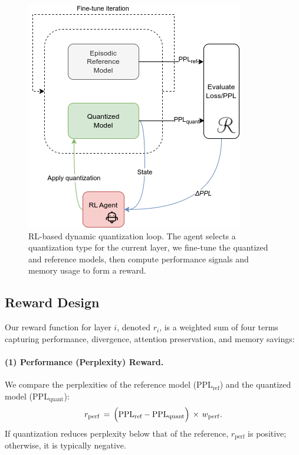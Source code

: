 \documentclass{article}
\begin{document}
	\begin{figure}[t]
		\centering
		\includegraphics[width=0.95\linewidth]{images/dynaq-scheme.png}
		\vspace{-0.5em}
		\caption{\small RL-based dynamic quantization loop. The agent selects a quantization type for the current layer, we fine-tune the quantized and reference models, then compute performance signals and memory usage to form a reward.}
		\label{fig:rl-env}
		\vspace{-0.5em}
	\end{figure}

    \subsection{Reward Design}
    \label{subsec:reward}
    
    Our reward function for layer \(i\), denoted \(r_i\), is a weighted sum of four terms capturing performance, divergence, attention preservation, and memory savings:
    
    \paragraph{(1) Performance (Perplexity) Reward.}
    We compare the perplexities of the reference model (\(\mathrm{PPL}_\text{ref}\)) and the quantized model (\(\mathrm{PPL}_\text{quant}\)):
    \begin{equation}
    	r_{\mathrm{perf}} 
    	\,=\, 
    	\Bigl(\mathrm{PPL}_\text{ref} - \mathrm{PPL}_\text{quant}\Bigr)
    	\,\times\, 
    	w_{\mathrm{perf}}.
    	\label{eq:perf_term}
    \end{equation}
    If quantization reduces perplexity below that of the reference, \(r_{\mathrm{perf}}\) is positive; otherwise, it is typically negative.
    
\end{document}
